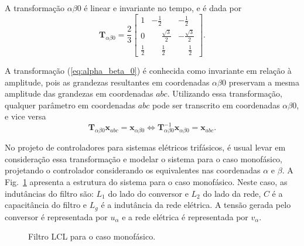   A transformação $\alpha \beta 0$ é linear e invariante no tempo, e é dada por
  \begin{equation}
    \mathbf{T}_{\alpha \beta 0} = \frac{2}{3} \left[
    \begin{array}{ccc}
      1 & -\frac{1}{2} & -\frac{1}{2} \\[0.3em]
      0 & \phantom{-}\frac{\sqrt{3}}{2} & -\frac{\sqrt{3}}{2} \\[0.3em]
      \frac{1}{2} &  \phantom{-}\frac{1}{2} & \phantom{-}\frac{1}{2}
    \end{array}
    \right] \text{.}
    \label{eq:alpha_beta_0}
  \end{equation}

  A transformação (\ref{eq:alpha_beta_0}) é conhecida como invariante em relação à amplitude, pois as grandezas resultantes em coordenadas $\alpha \beta 0$ preservam a mesma amplitude das grandezas em coordenadas $abc$. Utilizando essa transformação, qualquer parâmetro em coordenadas $abc$ pode ser transcrito em coordenadas $\alpha \beta 0$, e vice versa
  \begin{equation}
    \mathbf{T}_{\alpha \beta 0} \mathbf{x}_{abc} = \mathbf{x}_{\alpha \beta 0}
    \iff
    \mathbf{T}_{\alpha \beta 0}^{-1} \mathbf{x}_{\alpha \beta 0} = \mathbf{x}_{abc}
    \text{.}
  \end{equation}

  No projeto de controladores para sistemas elétricos trifásicos, é usual levar em consideração essa transformação e modelar o sistema para o caso monofásico, projetando o controlador considerando os equivalentes nas coordenadas $\alpha$ e $\beta$. A Fig.~\ref{fig:LCL_geral} apresenta a estrutura do sistema para o caso monofásico. Neste caso, as indutâncias do filtro são: $L_1$ do lado do conversor e $L_2$ do lado da rede, $C$ é a capacitância do filtro e $L_g$ é a indutância da rede elétrica. A tensão gerada pelo conversor é representada por $u_{\alpha}$ e a rede elétrica é representada por
  $v_{\alpha}$.

  \begin{figure}[htb]
    \centering{
      \def\svgwidth{\textwidth}
      }
    \renewcommand\figurename{Fig.}
    \caption{Filtro LCL para o caso monofásico.}
    \label{fig:LCL_geral}
  \end{figure}

